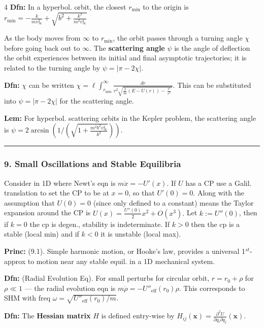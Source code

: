 \documentclass[landscape, 8pt]{extarticle}
\begin{document}
\begin{multicols*}{4}
		\textbf{Dfn:} In a hyperbol. orbit,  the closest $r_{\min}$ to the origin is
		$
		r_{\min}=-\frac{k}{mv_\infty^2}+\sqrt{b^2+\frac{k^2}{m^2v_\infty^4}}
		$
		
		As the body moves from $\infty$ to $r_{\min}$, the orbit passes through a turning angle $\chi$ before going back out to $\infty$. The \textbf{scattering angle} $\psi$ is the angle of deflection the orbit experiences between its initial and final asymptotic trajectories; it is related to the turning angle by
		$
		\psi=|\pi-2\chi|.
		$
		
		\textbf{Dfn:} $\chi$ can be written
		$
		\chi=\ell\int_{r_{\min}}^{\infty}\frac{dr}{r^2\sqrt{\frac{2}{m}(E-U(r))-\frac{\ell^2}{r^2}}}.
		$
		This can be substituted into $\psi=|\pi-2\chi|$ for the scattering angle.
		
		\textbf{Lem:} For hyperbol. scattering orbits in the Kepler problem, the scattering angle is
		$
		\psi = 2\arcsin\!\left(1/\left(\sqrt{1+\frac{m^2b^2v_\infty^4}{k^2}}\right)\right).
		$
		
		\hrule
		\vspace*{-3pt}
		\subsubsection*{\tiny{9. Small Oscillations and Stable Equilibria}}
		\vspace*{-5pt}
		
		Consider in 1D where Newt's eqn is $m\ddot{x}=-U'(x)$. If $U$ has a CP use a Galil. translation to set the CP to be at $x=0$, so that $U'(0)=0$. Along with the assumption that $U(0)=0$ (since only defined to a constant) means the Taylor expansion around the CP is
		$
		U(x) = \frac{U''(0)}{2}x^2+O(x^3).
		$
		Let $k:=U''(0)$, then if $k=0$ the cp is degen., stability is indeterminate. If $k>0$ then the cp is a stable (local min) and if $k<0$ it is unstable (local max).
		
		\textbf{Princ:} (9.1). Simple harmonic motion, or Hooke's law, provides a universal 1$^{st}$-approx to motion near any stable equil. in a 1D mechanical system.
		
		\textbf{Dfn:} (Radial Evolution Eq). For small perturbs for circular orbit, $r=r_0+\rho$ for $\rho\ll 1$ --- the radial evolution eqn is
		$
		m\ddot{\rho}=-U''_{\mathrm{eff}}(r_0)\rho.
		$
		This corresponds to SHM with freq $\omega=\sqrt{U''_{\mathrm{eff}}(r_0)/m}$.
		
		\textbf{Dfn:} The \textbf{Hessian matrix} $H$ is defined entry-wise by
		$
		H_{ij}(\mathbf{x})=\frac{\partial^2 U}{\partial q_i\partial q_j}(\mathbf{x}).
		$
		

\end{multicols*}
\end{document}
